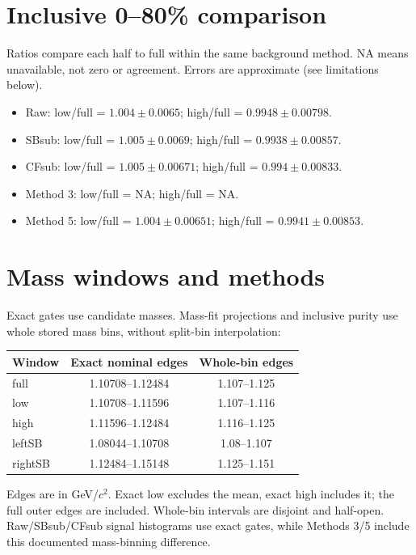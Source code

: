 \documentclass[10pt,a4paper]{article}
\begin{document}
\section{Inclusive 0--80\% comparison}
Ratios compare each half to full within the same background method. NA means unavailable, not zero or agreement. Errors are approximate (see limitations below).
\begin{itemize}
\item Raw: low/full = $1.004\pm0.0065$; high/full = $0.9948\pm0.00798$.
\item SBsub: low/full = $1.005\pm0.0069$; high/full = $0.9938\pm0.00857$.
\item CFsub: low/full = $1.005\pm0.00671$; high/full = $0.994\pm0.00833$.
\item Method 3: low/full = NA; high/full = NA.
\item Method 5: low/full = $1.004\pm0.00651$; high/full = $0.9941\pm0.00853$.
\end{itemize}\section{Mass windows and methods}
Exact gates use candidate masses. Mass-fit projections and inclusive purity use whole stored mass bins, without split-bin interpolation:
\begin{center}\begin{tabular}{lcc}\hline Window & Exact nominal edges & Whole-bin edges\\\hline
full & 1.10708--1.12484 & 1.107--1.125\\
low & 1.10708--1.11596 & 1.107--1.116\\
high & 1.11596--1.12484 & 1.116--1.125\\
leftSB & 1.08044--1.10708 & 1.08--1.107\\
rightSB & 1.12484--1.15148 & 1.125--1.151\\
\hline\end{tabular}\end{center}
Edges are in GeV/$c^2$. Exact low excludes the mean, exact high includes it; the full outer edges are included. Whole-bin intervals are disjoint and half-open. Raw/SBsub/CFsub signal histograms use exact gates, while Methods 3/5 include this documented mass-binning difference.
\end{document}

